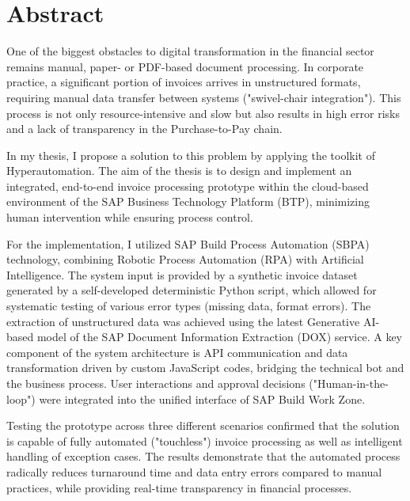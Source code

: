 \vfill
\selectenglish


\chapter*{Abstract}

One of the biggest obstacles to digital transformation in the financial sector remains manual, paper- or PDF-based document processing. In corporate practice, a significant portion of invoices arrives in unstructured formats, requiring manual data transfer between systems ("swivel-chair integration"). This process is not only resource-intensive and slow but also results in high error risks and a lack of transparency in the Purchase-to-Pay chain.

In my thesis, I propose a solution to this problem by applying the toolkit of Hyperautomation. The aim of the thesis is to design and implement an integrated, end-to-end invoice processing prototype within the cloud-based environment of the SAP Business Technology Platform (BTP), minimizing human intervention while ensuring process control.

For the implementation, I utilized SAP Build Process Automation (SBPA) technology, combining Robotic Process Automation (RPA) with Artificial Intelligence. The system input is provided by a synthetic invoice dataset generated by a self-developed deterministic Python script, which allowed for systematic testing of various error types (missing data, format errors). The extraction of unstructured data was achieved using the latest Generative AI-based model of the SAP Document Information Extraction (DOX) service. A key component of the system architecture is API communication and data transformation driven by custom JavaScript codes, bridging the technical bot and the business process. User interactions and approval decisions ("Human-in-the-loop") were integrated into the unified interface of SAP Build Work Zone.

Testing the prototype across three different scenarios confirmed that the solution is capable of fully automated ("touchless") invoice processing as well as intelligent handling of exception cases. The results demonstrate that the automated process radically reduces turnaround time and data entry errors compared to manual practices, while providing real-time transparency in financial processes.

\vfill
\cleardoublepage

\selectthesislanguage

\setcounter{romanPage}{\value{page}}
